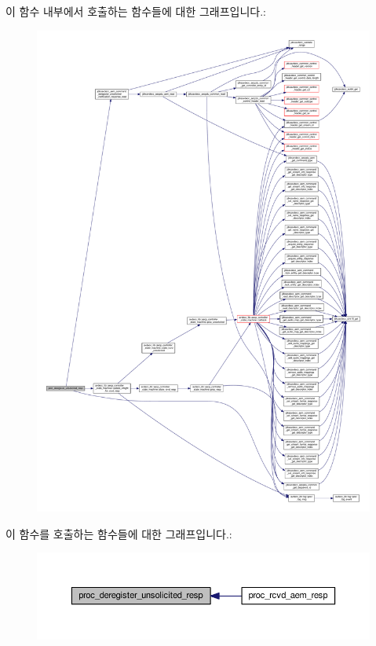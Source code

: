 이 함수 내부에서 호출하는 함수들에 대한 그래프입니다.\+:
\nopagebreak
\begin{figure}[H]
\begin{center}
\leavevmode
\includegraphics[width=350pt]{classavdecc__lib_1_1end__station__imp_a2427c30c802be85e96e3b36489dd1353_cgraph}
\end{center}
\end{figure}




이 함수를 호출하는 함수들에 대한 그래프입니다.\+:
\nopagebreak
\begin{figure}[H]
\begin{center}
\leavevmode
\includegraphics[width=350pt]{classavdecc__lib_1_1end__station__imp_a2427c30c802be85e96e3b36489dd1353_icgraph}
\end{center}
\end{figure}


